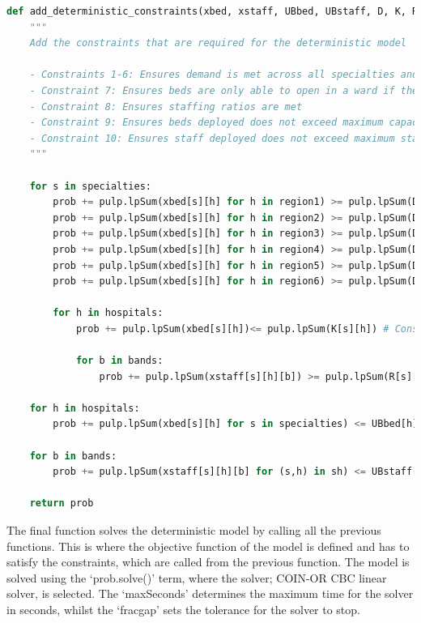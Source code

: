 \documentclass[../thesis.tex]{subfiles}
\begin{document}
\begin{lstlisting}[language = python]
def add_deterministic_constraints(xbed, xstaff, UBbed, UBstaff, D, K, R, sh, shb, prob):
    """
    Add the constraints that are required for the deterministic model
        
    - Constraints 1-6: Ensures demand is met across all specialties and all regions
    - Constraint 7: Ensures beds are only able to open in a ward if the facilities are able to be opened 
    - Constraint 8: Ensures staffing ratios are met
    - Constraint 9: Ensures beds deployed does not exceed maximum capacity of hospital
    - Constraint 10: Ensures staff deployed does not exceed maximum staffing resources
    """
    
    for s in specialties:
        prob += pulp.lpSum(xbed[s][h] for h in region1) >= pulp.lpSum(D[s][0]) #Constraint 1
        prob += pulp.lpSum(xbed[s][h] for h in region2) >= pulp.lpSum(D[s][1]) #Constraint 2
        prob += pulp.lpSum(xbed[s][h] for h in region3) >= pulp.lpSum(D[s][2]) #Constraint 3
        prob += pulp.lpSum(xbed[s][h] for h in region4) >= pulp.lpSum(D[s][3]) #Constraint 4
        prob += pulp.lpSum(xbed[s][h] for h in region5) >= pulp.lpSum(D[s][4]) #Constraint 5
        prob += pulp.lpSum(xbed[s][h] for h in region6) >= pulp.lpSum(D[s][5]) #Constraint 6
        
        for h in hospitals:
            prob += pulp.lpSum(xbed[s][h])<= pulp.lpSum(K[s][h]) # Constraint 7
                
            for b in bands:
                prob += pulp.lpSum(xstaff[s][h][b]) >= pulp.lpSum(R[s][b]*(xbed[s][h])) #Constraint 8
            
    for h in hospitals:
        prob += pulp.lpSum(xbed[s][h] for s in specialties) <= UBbed[h]  #Constraint 9
        
    for b in bands:
        prob += pulp.lpSum(xstaff[s][h][b] for (s,h) in sh) <= UBstaff[b] # #Constraint 10
        
    return prob
\end{lstlisting}

The final function solves the deterministic model by calling all the previous functions. This is where the objective function of the model is defined and has to satisfy the constraints, which are called from the previous function. The model is solved using the `prob.solve()' term, where the solver; COIN-OR CBC linear solver, is selected. The `maxSeconds' determines the maximum time for the solver in seconds, whilst the `fracgap' sets the tolerance for the solver to stop.
\end{document}

